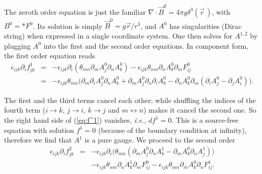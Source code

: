 \documentclass[a4paper,12pt]{article}
\begin{document}
\vskip -0.5cm
\noindent The zeroth order equation is just the familiar 
$\nabla \cdot \vec B^0=4\pi g\delta^3(\vec r\,)$, with $B^0=\ast F^0$.
Its solution is simply $\vec B^0=g\vec r/r^3$, and $A^0$ has singularities
(Dirac string) when expressed in a single coordinate system. One then 
solves for $A^{1, 2}$ by plugging $A^0$ into the f\mbox{}irst and the 
second order equations. In component form, the f\mbox{}irst order equation
reads
{\setlength\arraycolsep{2pt}
\begin{eqnarray} \label{eq:f^1}
\epsilon_{ijk}\partial_i f^1_{jk} & = & -\epsilon_{ijk}\partial_i 
           (\theta_{mn}\partial_m A^0_j\partial_n A^0_k)
            -\epsilon_{ijk}\theta_{nm}\partial_n A^0_k\partial_m F^0_{ij}
                                      \nonumber\\
 & = & -\epsilon_{ijk}\theta_{mn}\Big(\partial_m \partial_i A^0_j
                  \partial_n A^0_k
            +\partial_mA^0_j\partial_n\partial_i A^0_k   
            -\partial_n A^0_k\partial_m (\partial_i A_j^0-
                   \partial_j A_i^0)\Big).
\end{eqnarray}}

\vskip -0.5cm
\noindent The f\mbox{}irst and the third terms cancel each other; 
while shuf\mbox{}f\mbox{}ling
the indices of the fourth term ($i\to k$, $j\to i$, $k\to j$ and 
$m\leftrightarrow n$) makes it cancel the second one. So the right hand side of
(\ref{eq:f^1}) vanishes, {\it i.e.}, $d f^1=0$. This is a source-free 
equation with solution $f^1=0$ (because of the boundary condition at
inf\mbox{}inity),
therefore we f\mbox{}ind that $A^1$ is a pure gauge. We proceed to the 
second order
{\setlength\arraycolsep{2pt}
\begin{eqnarray} \label{eq:f^2}
\epsilon_{ijk}\partial_i f^2_{jk} & = & -\epsilon_{ijk}\partial_i
           \Big(\theta_{mn}(\partial_m A^0_j\partial_n A^1_k-
                            \partial_m A^0_k\partial_n A^1_j)\Big) \nonumber\\
 & & -\epsilon_{ijk}\theta_{nm}\partial_n A^1_k\partial_m F^0_{ij}
     -\epsilon_{ijk}\theta_{mn}\partial_m A^0_k\partial_n F^1_{ij}.
\end{eqnarray}}
\end{document}
